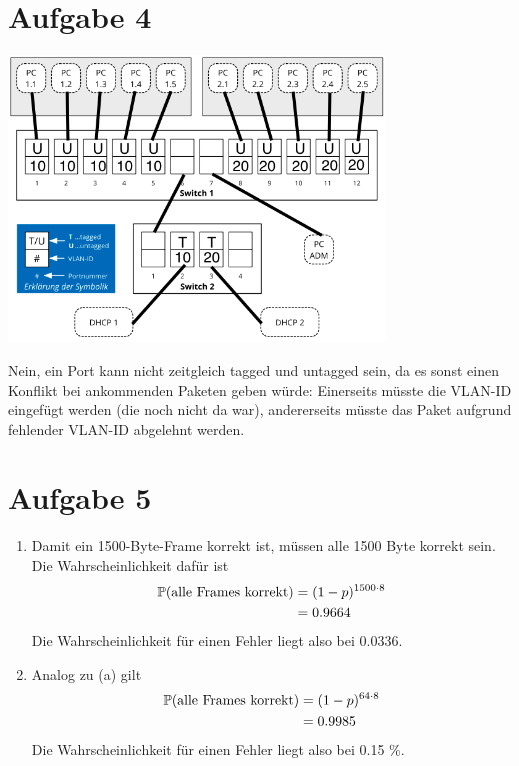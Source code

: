 \documentclass{article}
\begin{document}
	\section*{Aufgabe 4}
	\begin{center}
		\centering
		\includegraphics[width=0.75\textwidth]{./pics/Verkabelung}
	\end{center}
	Nein, ein Port kann nicht zeitgleich tagged und untagged sein, da es sonst einen Konflikt bei ankommenden Paketen geben würde: Einerseits müsste die VLAN-ID eingefügt werden (die noch nicht da war), andererseits müsste das Paket aufgrund fehlender VLAN-ID abgelehnt werden.

	\section*{Aufgabe 5}
	\begin{enumerate}[label=(\alph*)]
		\item Damit ein 1500-Byte-Frame korrekt ist, müssen alle 1500 Byte korrekt sein. Die Wahrscheinlichkeit dafür ist
		\begin{align}
			\mathbb{P}(\text{alle Frames korrekt}) &= (1-p)^{1500\cdot 8} \notag \\
			&= 0.9664 \notag
		\end{align}
		Die Wahrscheinlichkeit für einen Fehler liegt also bei 0.0336.
		\item Analog zu (a) gilt
		\begin{align}
			\mathbb{P}(\text{alle Frames korrekt}) &= (1-p)^{64\cdot 8} \notag \\
			&= 0.9985 \notag
		\end{align}
		Die Wahrscheinlichkeit für einen Fehler liegt also bei 0.15 \%.
	\end{enumerate}
\end{document}

